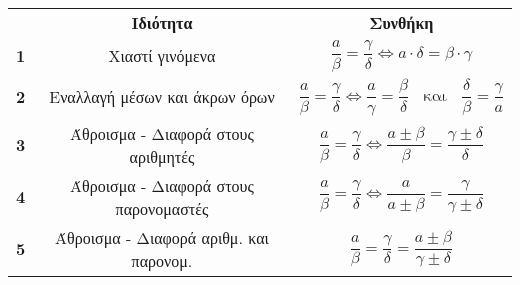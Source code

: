 \documentclass[a4paper,11pt]{article}
\begin{document}
\begin{center}
\begin{tabular}{ccc}
\hline \rule[-2ex]{0pt}{5.5ex} & \textbf{Ιδιότητα} & \textbf{Συνθήκη} \\
\hhline{===}\rule[-2ex]{0pt}{5.5ex} \textbf{1} & Χιαστί γινόμενα & $ \dfrac{a}{\beta}=\dfrac{\gamma}{\delta}\Leftrightarrow a\cdot\delta=\beta\cdot\gamma $ \\
\rule[-2ex]{0pt}{7ex} \textbf{2} & Εναλλαγή μέσων και άκρων όρων & $ \dfrac{a}{\beta}=\dfrac{\gamma}{\delta}\Leftrightarrow \dfrac{a}{\gamma}=\dfrac{\beta}{\delta}\;\;\textrm{ και }\;\;\dfrac{\delta}{\beta}=\dfrac{\gamma}{a} $\\
\rule[-2ex]{0pt}{7ex} \textbf{3} & Άθροισμα - Διαφορά στους αριθμητές & $ \dfrac{a}{\beta}=\dfrac{\gamma}{\delta}\Leftrightarrow \dfrac{a\pm\beta}{\beta}=\dfrac{\gamma\pm\delta}{\delta} $\\
\rule[-2ex]{0pt}{7ex} \textbf{4} & Άθροισμα - Διαφορά στους παρονομαστές & $ \dfrac{a}{\beta}=\dfrac{\gamma}{\delta}\Leftrightarrow \dfrac{a}{a\pm\beta}=\dfrac{\gamma}{\gamma\pm\delta} $\\
\rule[-2ex]{0pt}{7ex} \textbf{5} & Άθροισμα - Διαφορά αριθμ. και παρονομ. & $ \dfrac{a}{\beta}=\dfrac{\gamma}{\delta}=\dfrac{a\pm\beta}{\gamma\pm\delta} $\\
\hline
\end{tabular}
\end{center}
\end{document}
